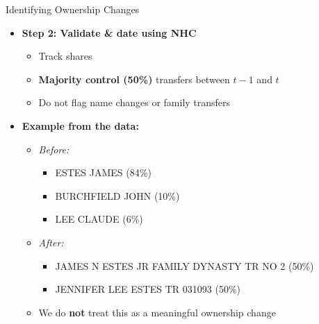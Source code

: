 \documentclass{beamer}
\begin{document}
\begin{frame}[t]{Identifying Ownership Changes}

\small
\begin{itemize}
	\item \textbf{Step 2: Validate \& date using NHC}
	
	\begin{itemize}
		\item Track shares
		\item \textbf{Majority control (50\%)} transfers between $t-1$ and $t$
		\item Do not flag name changes or family transfers
  \end{itemize}

	\vspace{0.35em}
	
	\pause

	\item \textbf{Example from the data:}
	
	\begin{itemize}
		\item \textit{Before:}
		
		\begin{itemize}
			\item ESTES JAMES (84\%)
			\item BURCHFIELD JOHN (10\%)
			\item LEE CLAUDE (6\%)
		\end{itemize}

	\item \textit{After:}
	
		\begin{itemize}
			\item JAMES N ESTES JR FAMILY DYNASTY TR NO 2 (50\%)
			\item JENNIFER LEE ESTES TR 031093 (50\%)
		\end{itemize}

	\item We do \textbf{not} treat this as a meaningful ownership change
	\end{itemize}
	
\end{itemize}
\end{frame}
\end{document}
